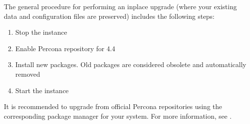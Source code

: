 \documentclass[letterpaper,10pt,english]{sphinxmanual}
\begin{document}
\sphinxAtStartPar
The general procedure for performing an in\sphinxhyphen{}place upgrade (where your existing
data and configuration files are preserved) includes the following steps:
\begin{enumerate}
%
\item {} 
\sphinxAtStartPar
Stop the  instance

\item {} 
\sphinxAtStartPar
Enable Percona repository for  4.4

\item {} 
\sphinxAtStartPar
Install new packages. Old packages are considered obsolete and automatically removed

\item {} 
\sphinxAtStartPar
Start the  instance

\end{enumerate}

\sphinxAtStartPar
It is recommended to upgrade  from official Percona repositories using
the corresponding package manager for your system.  For more information, see
{\hyperref[\detokenize{install/index:install}]{}}.
\end{document}
